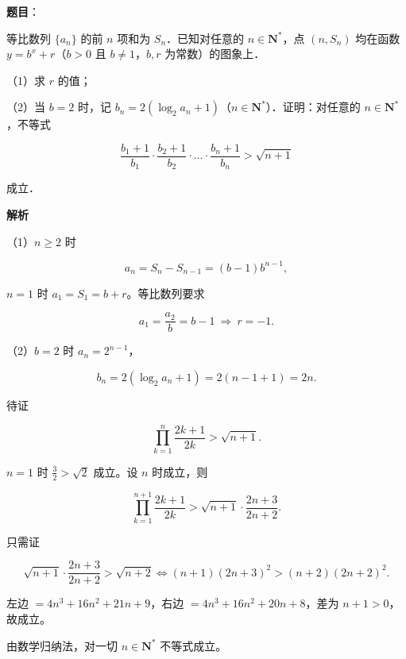 \begin{answer}

\textbf{题目}：

等比数列 $\{a_n\}$ 的前 $n$ 项和为 $S_n$．已知对任意的 $n\in\mathbf N^*$，点 $(n,S_n)$ 均在函数 $y=b^x+r$（$b>0$ 且 $b\neq1$，$b,r$ 为常数）的图象上．

（1）求 $r$ 的值；

（2）当 $b=2$ 时，记 $b_n=2(\log_2a_n+1)$（$n\in\mathbf N^*$）．证明：对任意的 $n\in\mathbf N^*$，不等式

\nopagebreak[4]
\[\frac{b_1+1}{b_1}\cdot\frac{b_2+1}{b_2}\cdot\ldots\cdot\frac{b_n+1}{b_n}>\sqrt{n+1}\]

成立．

\textbf{解析}

（1）$n\geqslant2$ 时

\nopagebreak[4]
\[a_n=S_n-S_{n-1}=(b-1)b^{n-1},\]

$n=1$ 时 $a_1=S_1=b+r$。等比数列要求

\nopagebreak[4]
\[a_1=\frac{a_2}{b}=b-1\ \Longrightarrow\ r=-1 .\]

（2）$b=2$ 时 $a_n=2^{n-1}$，

\nopagebreak[4]
\[b_n=2(\log_2a_n+1)=2(n-1+1)=2n .\]

待证

\nopagebreak[4]
\[\prod_{k=1}^{n}\frac{2k+1}{2k}>\sqrt{n+1}.\]

$n=1$ 时 $\frac32>\sqrt2$ 成立。设 $n$ 时成立，则

\nopagebreak[4]
\[\prod_{k=1}^{n+1}\frac{2k+1}{2k}>\sqrt{n+1}\cdot\frac{2n+3}{2n+2}.\]

只需证

\nopagebreak[4]
\[\sqrt{n+1}\cdot\frac{2n+3}{2n+2}>\sqrt{n+2}
\iff (n+1)(2n+3)^2>(n+2)(2n+2)^2 .\]

左边 $=4n^3+16n^2+21n+9$，右边 $=4n^3+16n^2+20n+8$，差为 $n+1>0$，故成立。

由数学归纳法，对一切 $n\in\mathbf N^*$ 不等式成立。


\end{answer}
